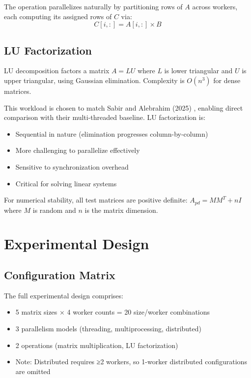 The operation parallelizes naturally by partitioning rows of $A$ across workers, each computing its assigned rows of $C$ via:
\[
C[i,:] = A[i,:] \times B
\]

\subsection{LU Factorization}

LU decomposition factors a matrix $A = LU$ where $L$ is lower triangular and $U$ is upper triangular, using Gaussian elimination. Complexity is $O(n^3)$ for dense matrices.

This workload is chosen to match Sabir and Alebrahim (2025) \cite{sabir2025coarse}, enabling direct comparison with their multi-threaded baseline. LU factorization is:

\begin{itemize}
    \item Sequential in nature (elimination progresses column-by-column)
    \item More challenging to parallelize effectively
    \item Sensitive to synchronization overhead
    \item Critical for solving linear systems
\end{itemize}

For numerical stability, all test matrices are positive definite: $A_{pd} = MM^T + nI$ where $M$ is random and $n$ is the matrix dimension.

\section{Experimental Design}

\subsection{Configuration Matrix}

The full experimental design comprises:

\begin{itemize}
    \item 5 matrix sizes × 4 worker counts = 20 size/worker combinations
    \item 3 parallelism models (threading, multiprocessing, distributed)
    \item 2 operations (matrix multiplication, LU factorization)
    \item Note: Distributed requires ≥2 workers, so 1-worker distributed configurations are omitted
\end{itemize}

